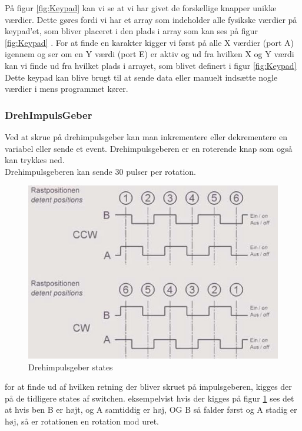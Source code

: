 På figur \ref{fig:Keypad} kan vi se at vi har givet de forskellige knapper unikke værdier. Dette gøres fordi vi har et array som indeholder alle fysikske værdier på keypad’et, som bliver placeret i den plads i array som kan ses på figur \ref{fig:Keypad} . For at finde en karakter kigger vi først på alle X værdier (port A) igennem og ser om en Y værdi (port E) er aktiv og ud fra hvilken X og Y værdi kan vi finde ud fra hvilket plads i arrayet, som blivet definert i figur \ref{fig:Keypad}
\\
Dette keypad kan blive brugt til at sende data eller manuelt indsætte nogle værdier i mens programmet kører.



\subsubsection{DrehImpulsGeber}

Ved at skrue på drehimpulsgeber kan man inkrementere eller dekrementere en variabel eller sende et event.
Drehimpulsgeberen er en roterende knap som også kan trykkes ned.\\
Drehimpulsgeberen kan sende 30 pulser per rotation.

\begin{figure}[ht]
			\begin{center}
			\includegraphics[scale=0.40]{Billeder/DrehImpulsGeber_events.jpg}
			\end{center}
			\caption{Drehimpulsgeber states}
			\label{fig:Impulsgeber}
		\end{figure}

for at finde ud af hvilken retning der bliver skruet på impulsgeberen, kigges der på de tidligere states af switchen.
eksempelvist hvis der kigges på figur \ref{fig:Impulsgeber} ses det at hvis ben B er højt, og A samtiddig er høj, OG B så falder først og A stadig er høj, så er rotationen en rotation mod uret.


